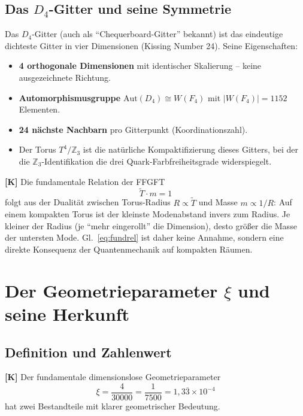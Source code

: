 \subsection{Das $D_4$-Gitter und seine Symmetrie}

Das $D_4$-Gitter (auch als ``Chequerboard-Gitter'' bekannt) ist das
eindeutige dichteste Gitter in vier Dimensionen (Kissing Number 24).
Seine Eigenschaften:

\begin{itemize}
  \item \textbf{4 orthogonale Dimensionen} mit identischer Skalierung
    -- keine ausgezeichnete Richtung.
  \item \textbf{Automorphismusgruppe} $\mathrm{Aut}(D_4) \cong W(F_4)$
    mit $|W(F_4)| = 1152$ Elementen.
  \item \textbf{24 nächste Nachbarn} pro Gitterpunkt (Koordinationszahl).
  \item Der Torus $T^4/\mathbb{Z}_3$ ist die natürliche Kompaktifizierung
    dieses Gitters, bei der die $\mathbb{Z}_3$-Identifikation die drei
    Quark-Farbfreiheitsgrade widerspiegelt.
\end{itemize}

\textbf{[K]} Die fundamentale Relation der FFGFT
\begin{equation}
  \tilde{T} \cdot m = 1
  \label{eq:fundrel}
\end{equation}
folgt aus der Dualität zwischen Torus-Radius $R \propto \tilde{T}$ und
Masse $m \propto 1/R$: Auf einem kompakten Torus ist der kleinste
Modenabstand invers zum Radius. Je kleiner der Radius (je ``mehr
eingerollt'' die Dimension), desto größer die Masse der untersten Mode.
Gl.~\eqref{eq:fundrel} ist daher keine Annahme, sondern eine direkte
Konsequenz der Quantenmechanik auf kompakten Räumen.

\section{Der Geometrieparameter $\xi$ und seine Herkunft}

\subsection{Definition und Zahlenwert}

\textbf{[K]} Der fundamentale dimensionslose Geometrieparameter
\begin{equation}
  \xi = \frac{4}{30000} = \frac{1}{7500}
      = 1{,}3\overline{3} \times 10^{-4}
  \label{eq:xi_def}
\end{equation}
hat zwei Bestandteile mit klarer geometrischer Bedeutung.

